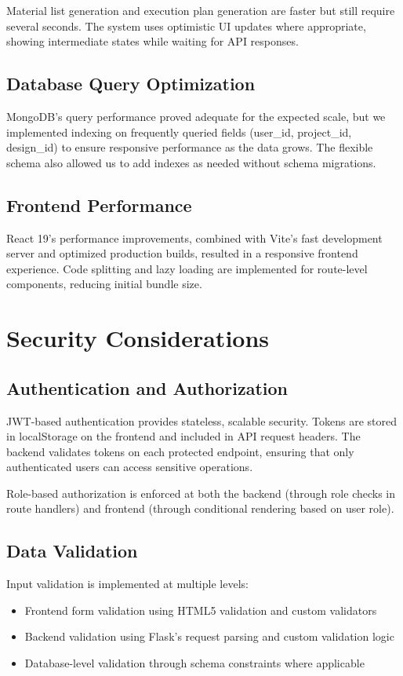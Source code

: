 \documentclass[conference]{IEEEtran}
\begin{document}
Material list generation and execution plan generation are faster but still require several seconds. The system uses optimistic UI updates where appropriate, showing intermediate states while waiting for API responses.

\subsection{Database Query Optimization}
MongoDB's query performance proved adequate for the expected scale, but we implemented indexing on frequently queried fields (user\_id, project\_id, design\_id) to ensure responsive performance as the data grows. The flexible schema also allowed us to add indexes as needed without schema migrations.

\subsection{Frontend Performance}
React 19's performance improvements, combined with Vite's fast development server and optimized production builds, resulted in a responsive frontend experience. Code splitting and lazy loading are implemented for route-level components, reducing initial bundle size.

\section{Security Considerations}

\subsection{Authentication and Authorization}
JWT-based authentication provides stateless, scalable security. Tokens are stored in localStorage on the frontend and included in API request headers. The backend validates tokens on each protected endpoint, ensuring that only authenticated users can access sensitive operations.

Role-based authorization is enforced at both the backend (through role checks in route handlers) and frontend (through conditional rendering based on user role).

\subsection{Data Validation}
Input validation is implemented at multiple levels:
\begin{itemize}
    \item Frontend form validation using HTML5 validation and custom validators
    \item Backend validation using Flask's request parsing and custom validation logic
    \item Database-level validation through schema constraints where applicable
\end{itemize}
\end{document}
